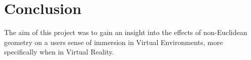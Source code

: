 \chapter{Conclusion}
\label{conclusion}

	The aim of this project was to gain an insight into the effects of non-Euclidean geometry on a users sense of immersion in Virtual Environments, more specifically when in Virtual Reality.

